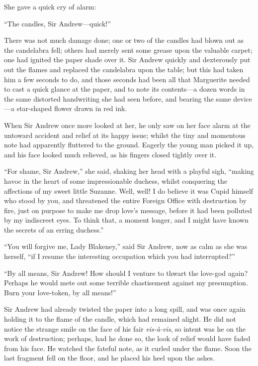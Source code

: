 \documentclass[paper=5.5in:8.5in,BCOR=7mm,twoside,DIV=calc,12pt,usegeometry,chapterprefix,endperiod,headings=big]{scrbook}
\begin{document}
She gave a quick cry of alarm:

\enquote{The candles, Sir Andrew---quick!}

There was not much damage done; one or two of the candles had blown out as the candelabra fell; others had merely sent some grease upon the valuable carpet; one had ignited the paper shade over it. Sir Andrew quickly and dexterously put out the flames and replaced the candelabra upon the table; but this had taken him a few seconds to do, and those seconds had been all that Marguerite needed to cast a quick glance at the paper, and to note its contents---a dozen words in the same distorted handwriting she had seen before, and bearing the same device---a star-shaped flower drawn in red ink.

When Sir Andrew once more looked at her, he only saw on her face alarm at the untoward accident and relief at its happy issue; whilst the tiny and momentous note had apparently fluttered to the ground. Eagerly the young man picked it up, and his face looked much relieved, as his fingers closed tightly over it.

\enquote{For shame, Sir Andrew,} she said, shaking her head with a playful sigh, \enquote{making havoc in the heart of some impressionable duchess, whilst conquering the affections of my sweet little Suzanne. Well, well! I do believe it was Cupid himself who stood by you, and threatened the entire Foreign Office with destruction by fire, just on purpose to make me drop love's message, before it had been polluted by my indiscreet eyes. To think that, a moment longer, and I might have known the secrets of an erring duchess.}

\enquote{You will forgive me, Lady Blakeney,} said Sir Andrew, now as calm as she was herself, \enquote{if I resume the interesting occupation which you had interrupted?}

\enquote{By all means, Sir Andrew! How should I venture to thwart the love-god again? Perhaps he would mete out some terrible chastisement against my presumption. Burn your love-token, by all means!}

Sir Andrew had already twisted the paper into a long spill, and was once again holding it to the flame of the candle, which had remained alight. He did not notice the strange smile on the face of his fair \textit{vis-à-vis}, so intent was he on the work of destruction; perhaps, had he done so, the look of relief would have faded from his face. He watched the fateful note, as it curled under the flame. Soon the last fragment fell on the floor, and he placed his heel upon the ashes.
\end{document}
